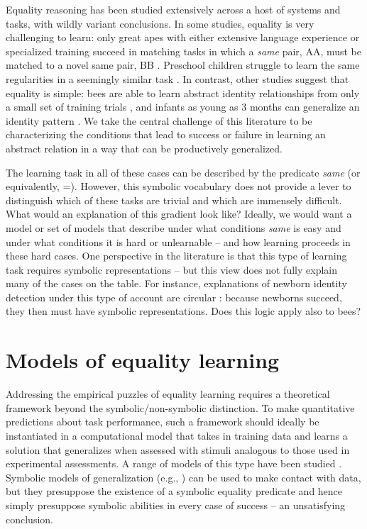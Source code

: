 \documentclass{article}
\begin{document}
Equality reasoning has been studied extensively across a host of systems and tasks, with wildly variant conclusions. In some studies, equality is very challenging to learn: only great apes with either extensive language experience or specialized training succeed in matching tasks in which a \emph{same} pair, AA, must be matched to a novel same pair, BB \cite{Premack:1983,thompson:2001}. Preschool children struggle to learn the same regularities in a seemingly similar task \cite{walker:2016}. In contrast, other studies suggest that equality is simple: bees are able to learn abstract identity relationships from only a small set of training trials \cite{avargues:2011}, and infants as young as 3 months can generalize an identity pattern \cite{anderson:2018}. We take the central challenge of this literature to be characterizing the conditions that lead to success or failure in learning an abstract relation in a way that can be productively generalized.

The learning task in all of these cases can be described by the predicate \emph{same} (or equivalently, =).  However, this symbolic vocabulary does not provide a lever to distinguish which of these tasks are trivial and which are immensely difficult. What would an explanation of this gradient look like? Ideally, we would want a model or set of models that describe under what conditions \emph{same} is easy and under what conditions it is hard or unlearnable -- and how learning proceeds in these hard cases. One perspective in the literature is that this type of learning task requires symbolic representations \cite{marcus:1999,Premack:1983} -- but this view does not fully explain many of the cases on the table. For instance, explanations of newborn identity detection under this type of account are circular \cite{gervain:2012}: because newborns succeed, they then must have symbolic representations. Does this logic apply also to bees?


\section{Models of equality learning}

Addressing the empirical puzzles of equality learning requires a theoretical framework beyond the symbolic/non-symbolic distinction. To make quantitative predictions about task performance, such a framework should ideally be instantiated in a computational model that takes in training data and learns a solution that generalizes when assessed with stimuli analogous to those used in experimental assessments. A range of models of this type have been studied \cite{alhama:2019}. Symbolic models of generalization (e.g., \citealt{frank:2011}) can be used to make contact with data, but they presuppose the existence of a symbolic equality predicate and hence simply presuppose symbolic abilities in every case of success -- an unsatisfying conclusion.
\end{document}
